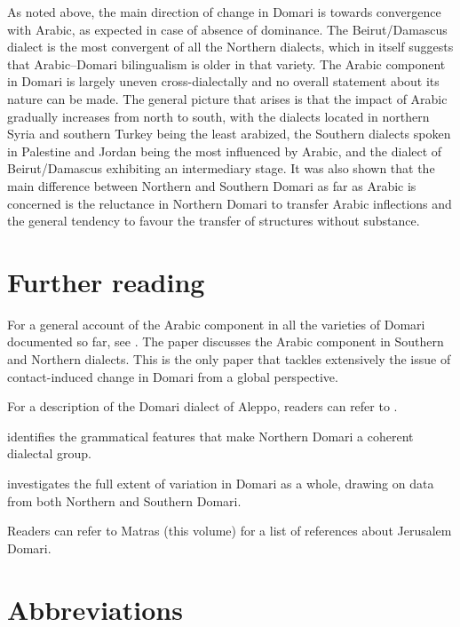 \documentclass[output=paper]{langsci/langscibook}
\begin{document}
As noted above, the main direction of change in Domari is towards convergence with Arabic, as expected in case of absence of dominance. The Beirut/Damascus dialect is the most convergent of all the Northern dialects, which in itself suggests that Arabic--Domari bilingualism is older in that variety. The Arabic component in Domari is largely uneven cross-dialectally and no overall statement about its nature can be made. The general picture that arises is that the impact of Arabic gradually increases from north to south, with the dialects located in northern Syria and southern Turkey being the least arabized, the Southern dialects spoken in Palestine and Jordan being the most influenced by Arabic, and the dialect of Beirut/Damascus exhibiting an intermediary stage. It was also shown that the main difference between Northern and Southern Domari as far as Arabic is concerned is the reluctance in Northern Domari to transfer Arabic inflections and the general tendency to favour the transfer of structures without substance.

\section*{Further reading}

For a general account of the Arabic component in all the varieties of Domari documented so far, see \citet{Herin2018}. The paper discusses the Arabic component in Southern and Northern dialects. This is the only paper that tackles extensively the issue of contact-induced change in Domari from a global perspective.

For a description of the Domari dialect of Aleppo, readers can refer to \citet{Herin2012}.

\citet{Herin2014Domari} identifies the grammatical features that make Northern Domari a coherent dialectal group.

\citet{Herin2016} investigates the full extent of variation in Domari as a whole, drawing on data from both Northern and Southern Domari.

Readers can refer to Matras (this volume) for a list of references about Jerusalem Domari.

\section*{Abbreviations}
\end{document}
